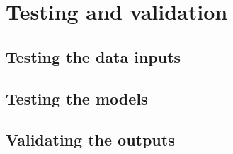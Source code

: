 
\chapter{Testing and validation} %

\label{Chapter6} %



\section{Testing the data inputs}


\section{Testing the models}



\section{Validating the outputs}
